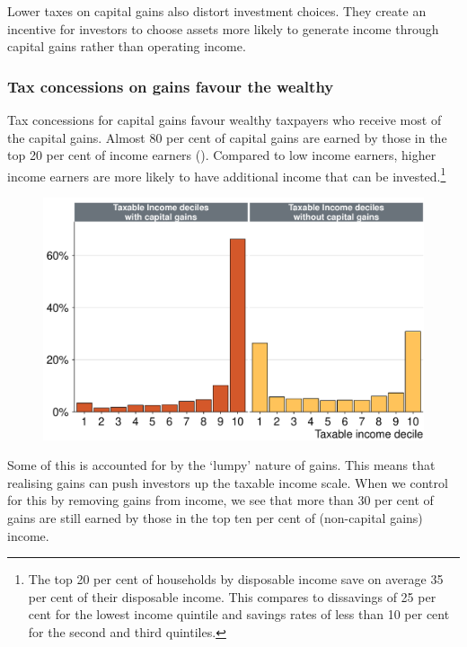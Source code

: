 \documentclass{grattan}\usepackage[]{graphicx}\usepackage[]{color}
\newcommand\gao{Grattan analysis of}
\begin{document}
Lower taxes on capital gains also distort investment choices. They create an incentive for investors to choose assets more likely to generate income through capital gains rather than operating income.

\subsubsection{Tax concessions on gains favour the wealthy}
Tax concessions for capital gains favour wealthy taxpayers who receive most of the capital gains. Almost 80 per cent of capital gains are earned by those in the top 20 per cent of income earners (). Compared to low income earners, higher income earners are more likely to have additional income that can be invested.\footnote{The top 20 per cent of households by disposable income save on average 35 per cent of their disposable income. This compares to dissavings of 25 per cent for the lowest income quintile and savings rates of less than 10 per cent for the second and third quintiles.}


\begin{figure}
\includegraphics[width=\columnwidth]{figure/Nearly_eighty_per_cent_of_capital_gains_are_earned_by_those_-1}
\source{\gao\ \textcite{ATO2013i}}
\end{figure}
Some of this is accounted for by the `lumpy' nature of gains. This means that realising gains can push investors up the taxable income scale. When we control for this by removing gains from income, we see that more than 30 per cent of gains are still earned by those in the top ten per cent of (non-capital gains) income. 
\end{document}
